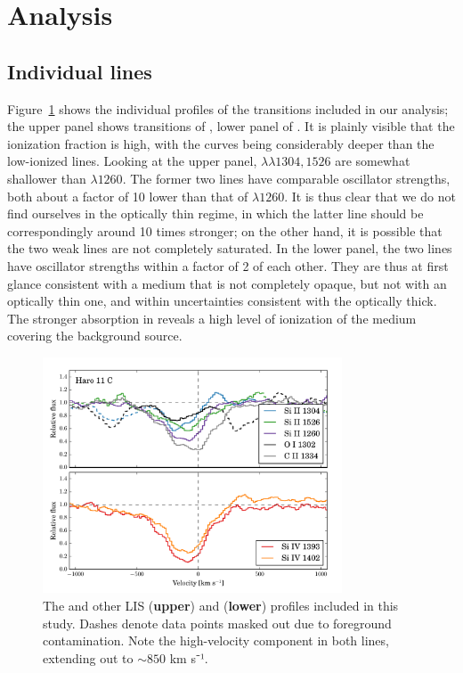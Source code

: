\documentclass[twocolumn]{aastex61}
\begin{document}
\section{Analysis}\label{analysis}

\subsection{Individual lines}\label{individual-lines}

Figure~\ref{fig:SingleLines} shows the individual profiles of the
transitions included in our analysis; the upper panel shows transitions
of , lower panel of . It is plainly visible that
the ionization fraction is high, with the  curves being
considerably deeper than the low-ionized lines. Looking at the upper
panel,  $\lambda \lambda 1304, 1526$ are somewhat shallower
than  $\lambda 1260$. The former two lines have comparable
oscillator strengths, both about a factor of 10 lower than that of
$\lambda 1260$. It is thus clear that we do not find ourselves in the
optically thin regime, in which the latter line should be
correspondingly around 10 times stronger; on the other hand, it is
possible that the two weak lines are not completely saturated. In the
lower panel, the two  lines have oscillator strengths within
a factor of 2 of each other. They are thus at first glance consistent
with a medium that is not completely opaque, but not with an optically
thin one, and within uncertainties consistent with the optically thick.
The stronger absorption in  reveals a high level of
ionization of the medium covering the background source.

\begin{figure}
\centering
\includegraphics[width=3.500in]{./HISLISProfiles.pdf}
\caption{The  and other LIS (\textbf{upper}) and 
(\textbf{lower}) profiles included in this study. Dashes denote data
points masked out due to foreground contamination. Note the
high-velocity component in both  lines, extending out to
$\sim 850$ km s⁻¹.}\label{fig:SingleLines}
\end{figure}
\end{document}
